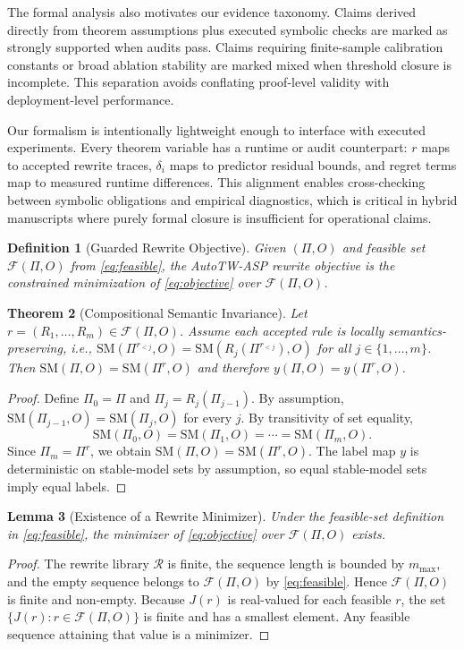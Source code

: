 \documentclass{article} %
\newtheorem{theorem}{Theorem}[section]
\newtheorem{lemma}[theorem]{Lemma}
\newtheorem{definition}[theorem]{Definition}
\begin{document}
The formal analysis also motivates our evidence taxonomy. Claims derived directly from theorem assumptions plus executed symbolic checks are marked as strongly supported when audits pass. Claims requiring finite-sample calibration constants or broad ablation stability are marked mixed when threshold closure is incomplete. This separation avoids conflating proof-level validity with deployment-level performance.

Our formalism is intentionally lightweight enough to interface with executed experiments. Every theorem variable has a runtime or audit counterpart: $r$ maps to accepted rewrite traces, $\delta_i$ maps to predictor residual bounds, and regret terms map to measured runtime differences. This alignment enables cross-checking between symbolic obligations and empirical diagnostics, which is critical in hybrid manuscripts where purely formal closure is insufficient for operational claims.

\begin{definition}[Guarded Rewrite Objective]
Given $(\Pi,O)$ and feasible set $\mathcal{F}(\Pi,O)$ from \eqref{eq:feasible}, the AutoTW-ASP rewrite objective is the constrained minimization of \eqref{eq:objective} over $\mathcal{F}(\Pi,O)$.
\end{definition}

\begin{theorem}[Compositional Semantic Invariance]
\label{thm:semantic}
Let $r=(R_1,\ldots,R_m)\in\mathcal{F}(\Pi,O)$. Assume each accepted rule is locally semantics-preserving, i.e.,
$\mathrm{SM}(\Pi^{r_{<j}},O)=\mathrm{SM}(R_j(\Pi^{r_{<j}}),O)$ for all $j\in\{1,\ldots,m\}$. Then
$\mathrm{SM}(\Pi,O)=\mathrm{SM}(\Pi^r,O)$ and therefore $y(\Pi,O)=y(\Pi^r,O)$.
\end{theorem}
\begin{proof}
Define $\Pi_0=\Pi$ and $\Pi_j=R_j(\Pi_{j-1})$. By assumption, $\mathrm{SM}(\Pi_{j-1},O)=\mathrm{SM}(\Pi_j,O)$ for every $j$. By transitivity of set equality,
\[
\mathrm{SM}(\Pi_0,O)=\mathrm{SM}(\Pi_1,O)=\cdots=\mathrm{SM}(\Pi_m,O).
\]
Since $\Pi_m=\Pi^r$, we obtain $\mathrm{SM}(\Pi,O)=\mathrm{SM}(\Pi^r,O)$. The label map $y$ is deterministic on stable-model sets by assumption, so equal stable-model sets imply equal labels.
\end{proof}

\begin{lemma}[Existence of a Rewrite Minimizer]
\label{lem:argmin}
Under the feasible-set definition in \eqref{eq:feasible}, the minimizer of \eqref{eq:objective} over $\mathcal{F}(\Pi,O)$ exists.
\end{lemma}
\begin{proof}
The rewrite library $\mathcal{R}$ is finite, the sequence length is bounded by $m_{\max}$, and the empty sequence belongs to $\mathcal{F}(\Pi,O)$ by \eqref{eq:feasible}. Hence $\mathcal{F}(\Pi,O)$ is finite and non-empty. Because $J(r)$ is real-valued for each feasible $r$, the set $\{J(r): r\in\mathcal{F}(\Pi,O)\}$ is finite and has a smallest element. Any feasible sequence attaining that value is a minimizer.
\end{proof}
\end{document}
